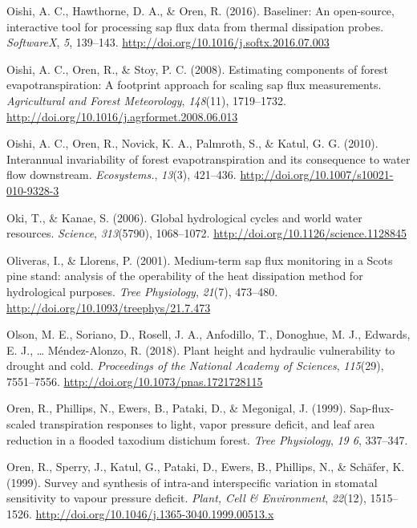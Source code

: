 \documentclass[11pt,twoside]{reedthesis}
\begin{document}
\hypertarget{ref-Oishi2016}{}
Oishi, A. C., Hawthorne, D. A., \& Oren, R. (2016). Baseliner: An
open-source, interactive tool for processing sap flux data from thermal
dissipation probes. \emph{SoftwareX}, \emph{5}, 139--143.
\url{http://doi.org/10.1016/j.softx.2016.07.003}

\hypertarget{ref-Oishi2008}{}
Oishi, A. C., Oren, R., \& Stoy, P. C. (2008). Estimating components of
forest evapotranspiration: A footprint approach for scaling sap flux
measurements. \emph{Agricultural and Forest Meteorology},
\emph{148}(11), 1719--1732.
\url{http://doi.org/10.1016/j.agrformet.2008.06.013}

\hypertarget{ref-Oishi2010}{}
Oishi, A. C., Oren, R., Novick, K. A., Palmroth, S., \& Katul, G. G.
(2010). Interannual invariability of forest evapotranspiration and its
consequence to water flow downstream. \emph{Ecosystems.}, \emph{13}(3),
421--436. \url{http://doi.org/10.1007/s10021-010-9328-3}

\hypertarget{ref-Oki2006}{}
Oki, T., \& Kanae, S. (2006). Global hydrological cycles and world water
resources. \emph{Science}, \emph{313}(5790), 1068--1072.
\url{http://doi.org/10.1126/science.1128845}

\hypertarget{ref-Oliveras2001}{}
Oliveras, I., \& Llorens, P. (2001). Medium-term sap flux monitoring in
a Scots pine stand: analysis of the operability of the heat dissipation
method for hydrological purposes. \emph{Tree Physiology}, \emph{21}(7),
473--480. \url{http://doi.org/10.1093/treephys/21.7.473}

\hypertarget{ref-olson_plant_2018}{}
Olson, M. E., Soriano, D., Rosell, J. A., Anfodillo, T., Donoghue, M.
J., Edwards, E. J., \ldots{} Méndez-Alonzo, R. (2018). Plant height and
hydraulic vulnerability to drought and cold. \emph{Proceedings of the
National Academy of Sciences}, \emph{115}(29), 7551--7556.
\url{http://doi.org/10.1073/pnas.1721728115}

\hypertarget{ref-Oren1999b}{}
Oren, R., Phillips, N., Ewers, B., Pataki, D., \& Megonigal, J. (1999).
Sap-flux-scaled transpiration responses to light, vapor pressure
deficit, and leaf area reduction in a flooded taxodium distichum forest.
\emph{Tree Physiology}, \emph{19 6}, 337--347.

\hypertarget{ref-Oren1999}{}
Oren, R., Sperry, J., Katul, G., Pataki, D., Ewers, B., Phillips, N., \&
Schäfer, K. (1999). Survey and synthesis of intra-and interspecific
variation in stomatal sensitivity to vapour pressure deficit.
\emph{Plant, Cell \& Environment}, \emph{22}(12), 1515--1526.
\url{http://doi.org/10.1046/j.1365-3040.1999.00513.x}
\end{document}
